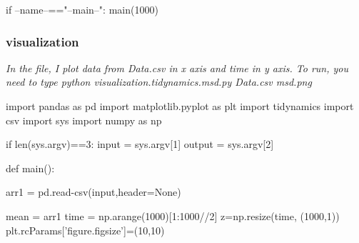 \documentclass[12pt, a4paper, twoside]{report}
\begin{document}
if --name--=="--main--":\newline
\hspace*{10mm}    main(1000)
\newpage
\subsubsection{visualization}
\textit{In the file, I plot data from Data.csv in x axis and time in y axis.\newline
To run, you need to type python visualization.tidynamics.msd.py Data.csv msd.png}


import pandas as pd\newline
import matplotlib.pyplot as plt\newline
import tidynamics\newline
import csv\newline
import sys\newline
import numpy as np\newline

if len(sys.argv)==3:\newline
\hspace*{10mm}    input = sys.argv[1]\newline
\hspace*{10mm}    output = sys.argv[2]\newline


def main():\newline


\hspace*{10mm}    arr1 = pd.read-csv(input,header=None)\newline


\hspace*{10mm}    mean = arr1\newline
\hspace*{10mm}    time = np.arange(1000)[1:1000//2]\newline
\hspace*{10mm}    z=np.resize(time, (1000,1))\newline
\hspace*{10mm}    plt.rcParams['figure.figsize']=(10,10)\newline
\end{document}
